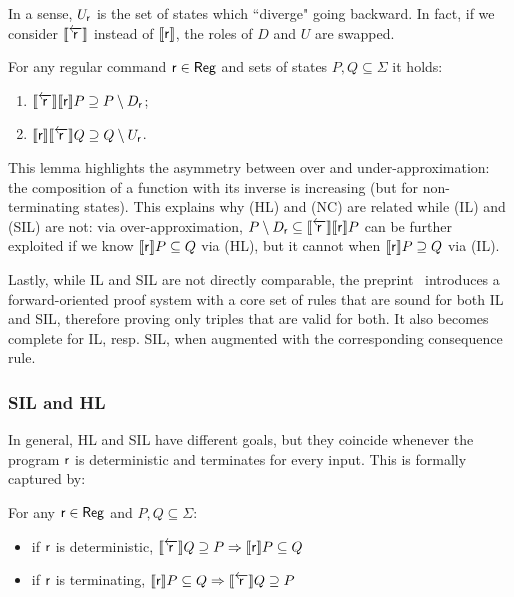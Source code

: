 In a sense, $U_{\mathsf{r}}$ is the set of states which ``diverge" going backward. In fact, if we consider $\llbracket\overleftarrow{\mathsf{r}}\rrbracket$ instead of $\llbracket\mathsf{r}\rrbracket$, the roles of $D$ and $U$ are swapped.

\begin{lemma}\label{lmm:sil:CC-1-monotone}
	For any regular command $\mathsf{r} \in \mathsf{Reg}$ and sets of states $P, Q \subseteq \Sigma$ it holds:
	\begin{enumerate}
		\item\label{lmm:sil:CC-1-monotone:1} $\llbracket\overleftarrow{\mathsf{r}}\rrbracket \llbracket\mathsf{r}\rrbracket P \supseteq P \setminus D_{\mathsf{r}}$;
		\item\label{lmm:sil:CC-1-monotone:2} $\llbracket\mathsf{r}\rrbracket \llbracket\overleftarrow{\mathsf{r}}\rrbracket Q \supseteq Q \setminus U_{\mathsf{r}}$.
	\end{enumerate}
\end{lemma}

This lemma highlights the asymmetry between over and under-approximation: the composition of a function with its inverse is increasing (but for non-terminating states).
This explains why (HL) and (NC) are related while (IL) and (SIL) are not: via over-approximation, $P \setminus D_{\mathsf{r}} \subseteq \llbracket\overleftarrow{\mathsf{r}}\rrbracket \llbracket\mathsf{r}\rrbracket P$ can be further exploited if we know $\llbracket\mathsf{r}\rrbracket P \subseteq Q$ via (HL), but it cannot when $\llbracket\mathsf{r}\rrbracket P \supseteq Q$ via (IL).

Lastly, while IL and SIL are not directly comparable, the preprint~\cite{RVO24} introduces a forward-oriented proof system with a core set of rules that are sound for both IL and SIL, therefore proving only triples that are valid for both. It also becomes complete for IL, resp. SIL, when augmented with the corresponding consequence rule.

\subsubsection{SIL and HL}
In general, HL and SIL have different goals, but they coincide whenever the program $\mathsf{r}$ is deterministic and terminates for every input. This is formally captured by:

\begin{prop}\label{prop:sil:sil-hl-deterministic-terminating}
	For any $\mathsf{r}\in \mathsf{Reg}$ and $P, Q \subseteq \Sigma$:
	\begin{itemize}
		\item if $\mathsf{r}$ is deterministic, $\llbracket\overleftarrow{\mathsf{r}}\rrbracket Q \supseteq P \Rightarrow \llbracket\mathsf{r}\rrbracket P \subseteq Q$
		\item if $\mathsf{r}$ is terminating, $\llbracket\mathsf{r}\rrbracket P \subseteq Q \Rightarrow \llbracket\overleftarrow{\mathsf{r}}\rrbracket Q \supseteq P$
	\end{itemize}
\end{prop}

